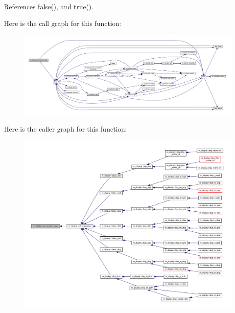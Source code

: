 References false(), and true().

Here is the call graph for this function\+:
\nopagebreak
\begin{figure}[H]
\begin{center}
\leavevmode
\includegraphics[width=350pt]{namespacem__display__util_a7a886d21010f7a6f0f8101d2b26fd97d_cgraph}
\end{center}
\end{figure}
Here is the caller graph for this function\+:
\nopagebreak
\begin{figure}[H]
\begin{center}
\leavevmode
\includegraphics[width=350pt]{namespacem__display__util_a7a886d21010f7a6f0f8101d2b26fd97d_icgraph}
\end{center}
\end{figure}
\mbox{\label{namespacem__display__util_a70f3818ca97ec91537e81b9f9b10953c}} 
